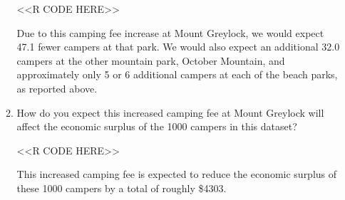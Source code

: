 \documentclass[11pt,letterpaper]{article}
\begin{document}
\begin{enumerate}[label=\alph*., leftmargin=*]
\begin{enumerate}[label=\roman*.]
		<<R CODE HERE>>

		Due to this camping fee increase at Mount Greylock, we would expect 47.1 fewer campers at that park. We would also expect an additional 32.0 campers at the other mountain park, October Mountain, and approximately only 5 or 6 additional campers at each of the beach parks, as reported above.

		\item How do you expect this increased camping fee at Mount Greylock will affect the economic surplus of the 1000 campers in this dataset?

		<<R CODE HERE>>

		This increased camping fee is expected to reduce the economic surplus of these 1000 campers by a total of roughly \$4303.
	\end{enumerate}
\end{enumerate}
\end{document}
